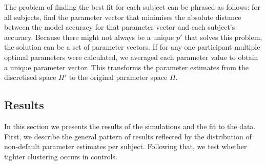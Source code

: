 \documentclass[10pt,letterpaper]{article}
\begin{document}
The problem of finding the best fit for each subject can be phrased as follows: for all subjects, find the parameter vector that minimises the absolute distance between the model accuracy for that parameter vector and each subject's accuracy. Because there might not always be a unique $p'$ that solves this problem, the solution can be a set of parameter vectors.
If for any one participant multiple optimal parameters were calculated, we averaged each parameter value to obtain a unique parameter vector. This transforms the parameter estimates from the discretised space $\Pi'$ to the original parameter space $\Pi$.

\subsection{Results}


In this section we presents the results of the simulations and the fit to the data. First, we describe the general pattern of results reflected by the distribution of non-default parameter estimates per subject. Following that, we test whether tighter clustering occurs in controls.

%
%
%
\end{document}
